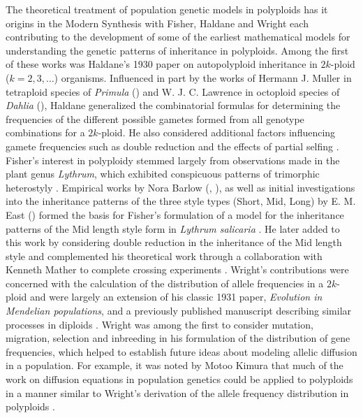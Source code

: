 \documentclass[11pt,english,letterpaper,oneside]{article}
\begin{document}
The theoretical treatment of population genetic models in polyploids has it origins in the Modern Synthesis with  Fisher, Haldane and Wright each contributing to the development of some of the earliest mathematical models for understanding the genetic patterns of inheritance in polyploids. Among the first of these works was Haldane's 1930 paper on autopolyploid inheritance in $2k$-ploid ($k=2,3,\dots$) organisms. Influenced in part by the works of Hermann J. Muller in tetraploid species of \textit{Primula} (\citeyear{muller1914primula}) and W. J. C. Lawrence in octoploid species of \textit{Dahlia} (\citeyear{lawrence1929dahlia}), Haldane generalized the combinatorial formulas for determining the frequencies of the different possible gametes formed from all genotype combinations for a $2k$-ploid. He also considered additional factors influencing gamete frequencies such as double reduction and the effects of partial selfing \citep{haldane1930autopolyploids}. Fisher's interest in polyploidy stemmed largely from observations made in the plant genus \textit{Lythrum}, which exhibited conspicuous patterns of trimorphic heterostyly \citep{fisher1941lythrum}. Empirical works by Nora Barlow (\citeyear{barlow1913heterostylism}, \citeyear{barlow1923trimorphic}), as well as initial investigations into the inheritance patterns of the three style types (Short, Mid, Long) by E. M. East (\citeyear{east1927lythrum}) formed the basis for Fisher's formulation of a model for the inheritance patterns of the Mid length style form in \textit{Lythrum salicaria} \citep{fisher1941lythrum}. He later added to this work by considering double reduction in the inheritance of the Mid length style and complemented his theoretical work through a collaboration with Kenneth Mather to complete crossing experiments \citep{fisher1943doublereduction,fisher1943mather}. Wright's contributions were concerned with the calculation of the distribution of allele frequencies in a $2k$-ploid and were largely an extension of his classic 1931 paper, \textit{Evolution in Mendelian populations}, and a previously published manuscript describing similar processes in diploids \citep{wright1931mendelianPops,wright1937geneFreqs,wright1938polyploid}. Wright was among the first to consider mutation, migration, selection and inbreeding in his formulation of the distribution of gene frequencies, which helped to establish future ideas about modeling allelic diffusion in a population. For example, it was noted by Motoo Kimura that much of the work on diffusion equations in population genetics could be applied to polyploids in a manner similar to Wright's derivation of the allele frequency distribution in polyploids \citep{kimura1964diffusion}.
\medskip
\end{document}
